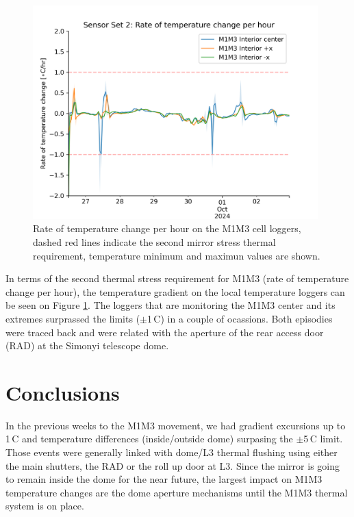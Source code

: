 \documentclass[SE,lsstdraft,authoryear,toc]{lsstdoc}
\begin{document}
\begin{figure}[h!]
  \centering 
  \includegraphics[width=11cm]{SITCOMTN-141_figures/Sensor2_1h_temp_derivative_int_center.png}
  \caption{Rate of temperature change per hour on the M1M3 cell loggers, dashed red lines indicate the second mirror stress thermal requirement, temperature minimum and maximun values are shown.}
  \label{fig_set2_derivative}
\end{figure}

In terms of the second thermal stress requirement for M1M3 (rate of temperature change per hour), the temperature gradient on the local temperature loggers can be seen on Figure \ref{fig_set2_derivative}. The loggers that are monitoring the M1M3 center and its extremes surprassed the limits ($\pm$1\,\textdegree C) in a couple of ocassions. Both episodies were traced back and were related with the aperture of the rear access door (RAD) at the Simonyi telescope dome.

\newpage
\section{Conclusions}
In the previous weeks to the M1M3 movement, we had gradient excursions up to 1\,\textdegree C and temperature differences (inside/outside dome) surpasing the $\pm$5\,\textdegree C limit. Those events were generally linked with dome/L3 thermal flushing using either the main shutters, the RAD or the roll up door at L3. Since the mirror is going to remain inside the dome for the near future, the largest impact on M1M3 temperature changes are the dome aperture mechanisms until the M1M3 thermal system is on place. 


\section{}
\end{document}
